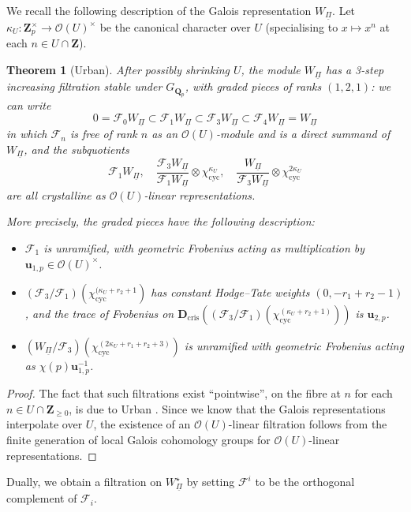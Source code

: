 \documentclass[cjm]{ipart}
\theoremstyle{plain}
\newtheorem{theorem}{Theorem}[subsection]
\theoremstyle{remark}
\newcommand{\Dcris}{\mathbf{D}_{\mathrm{cris}}}
\newcommand{\QQ}{\mathbf{Q}}
\newcommand{\Qp}{\QQ_p}
\newcommand{\ZZ}{\mathbf{Z}}
\newcommand{\Zp}{\mathbf{Z}_p}
\newcommand{\cO}{\mathcal{O}}
\newcommand{\sF}{\mathscr{F}}
\newcommand{\uPi}{\underline{\Pi}}
\numberwithin{equation}{subsection}
\renewcommand{\ge}{\geqslant}
\begin{document}
  We recall the following description of the Galois representation $W_{\uPi}$. Let $\kappa_U : \Zp^\times \to \cO(U)^\times$ be the canonical character over $U$ (specialising to $x \mapsto x^n$ at each $n \in U \cap \ZZ$).

  \begin{theorem}[Urban]
   After possibly shrinking $U$, the module $W_{\uPi}$ has a 3-step increasing filtration stable under $G_{\Qp}$, with graded pieces of ranks $(1, 2, 1)$: we can write
   \[ 0 = \sF_0 W_{\uPi} \subset \sF_1 W_{\uPi} \subset \sF_3 W_{\uPi}\subset \sF_4 W_{\uPi} =W_{\uPi}\]
   in which $\sF_n$ is free of rank $n$ as an $\cO(U)$-module and is a direct summand of $W_{\uPi}$, and the subquotients
   \[ \sF_1 W_{\uPi}, \quad
   \frac{\sF_3 W_{\uPi}}{\sF_1 W_{\uPi}} \otimes \chi_{\mathrm{cyc}}^{\kappa_U}, \quad
   \frac{W_{\uPi}}{\sF_3 W_{\uPi}} \otimes \chi_{\mathrm{cyc}}^{2\kappa_U}\]
   are all crystalline as $\cO(U)$-linear representations.

   More precisely, the graded pieces have the following description:
   \begin{itemize}
    \item $\sF_1$ is unramified, with geometric Frobenius acting as multiplication by $\mathbf{u}_{1, p} \in \cO(U)^\times$.
    \item $(\sF_3 / \sF_1)(\chi_{\mathrm{cyc}}^{(\kappa_U + r_2 + 1})$ has constant Hodge--Tate weights $(0, -r_1 + r_2-1)$, and the trace of Frobenius on $\Dcris\left((\sF_3 / \sF_1)(\chi_{\mathrm{cyc}}^{(\kappa_U + r_2 + 1)})\right)$ is $\mathbf{u}_{2, p}$.
    \item $(W_{\uPi} / \sF_3)(\chi_{\mathrm{cyc}}^{(2\kappa_U + r_1 + r_2 + 3)})$ is unramified with geometric Frobenius acting as $\chi(p) \mathbf{u}_{1, p}^{-1}$.
   \end{itemize}
  \end{theorem}

  \begin{proof}
   The fact that such filtrations exist ``pointwise'', on the fibre at $n$  for each $n \in U \cap \ZZ_{\ge 0}$, is due to Urban \cite{urban05}. Since we know that the Galois representations interpolate over $U$, the existence of an $\cO(U)$-linear filtration follows from the finite generation of local Galois cohomology groups for $\cO(U)$-linear representations.
  \end{proof}

  Dually, we obtain a filtration on $W_{\uPi}^{\star}$ by setting $\sF^i$ to be the orthogonal complement of $\sF_i$.
\end{document}
